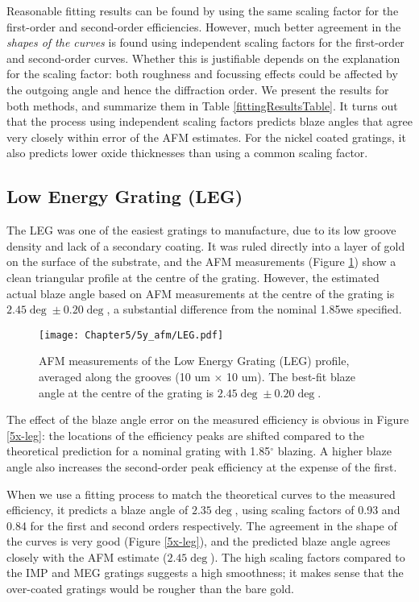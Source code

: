 Reasonable fitting results can be found by using the same scaling factor for the first-order and second-order efficiencies.  However, much better agreement in the \emph{shapes of the curves} is found using independent scaling factors for the first-order and second-order curves.   Whether this is justifiable depends on the explanation for the scaling factor: both roughness and focussing effects could be affected by the outgoing angle and hence the diffraction order.  We present the results for both methods, and summarize them in Table \ref{fittingResultsTable}.  It turns out that the process using independent scaling factors predicts blaze angles that agree very closely within error of the AFM estimates.  For the nickel coated gratings, it also predicts lower oxide thicknesses than using a common scaling factor.

\subsection{Low Energy Grating (LEG)}
The LEG was one of the easiest gratings to manufacture, due to its low groove density and lack of a secondary coating.  It was ruled directly into a layer of gold on the surface of the substrate, and the AFM measurements (Figure \ref{5y-leg}) show a clean triangular profile at the centre of the grating.  However, the estimated actual blaze angle based on AFM measurements at the centre of the grating is $2.45\deg \pm 0.20\deg$, a substantial difference from the nominal 1.85\dg we specified.

\begin{figure}[htbp] %
   \centering
   \texttt{[image: Chapter5/5y\_afm/LEG.pdf]} 
   \caption{AFM measurements of the Low Energy Grating (LEG) profile, averaged along the grooves (10 um $\times$ 10 um).  The best-fit blaze angle at the centre of the grating is $2.45\deg \pm 0.20\deg$.}
   \label{5y-leg}
\end{figure}
The effect of the blaze angle error on the measured efficiency is obvious in Figure \ref{5x-leg}: the locations of the efficiency peaks are shifted compared to the theoretical prediction for a nominal grating with 1.85$^\circ$ blazing.  A higher blaze angle also increases the second-order peak efficiency at the expense of the first.

When we use a fitting process to match the theoretical curves to the measured efficiency, it predicts a blaze angle of $2.35\deg$, using scaling factors of 0.93 and 0.84 for the first and second orders respectively.   The agreement in the shape of the curves is very good (Figure \ref{5x-leg}), and the predicted blaze angle agrees closely with the AFM estimate ($2.45\deg$).  The high scaling factors compared to the IMP and MEG gratings suggests a high smoothness; it makes sense that the over-coated gratings would be rougher than the bare gold.

